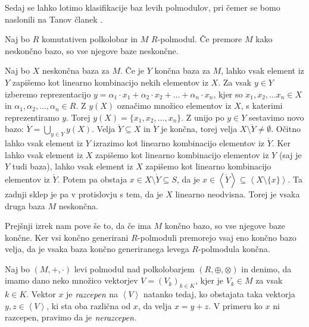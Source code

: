\documentclass[mat1]{fmfdelo}
\newcommand{\pojem}[1]{\ensuremath{\emph{#1}}}
\newcommand{\Gen}[1]{\ensuremath{\left<{#1}\right>}}
\begin{document}
Sedaj se lahko lotimo klasifikacije baz levih polmodulov, pri čemer se bomo naslonili na Tanov članek \cite{bib:Tanbase}.

\begin{izrek}
	Naj bo $R$ komutativen polkolobar in $M$ $R$-polmodul. Če premore $M$ kako neskončno bazo, so vse njegove baze neskončne.
\end{izrek}
\begin{dokaz}
	Naj bo $X$ neskončna baza za $M$. Če je $Y$ končna baza za $M$, lahko vsak element iz $Y$ zapišemo kot linearno kombinacijo nekih elementov iz $X$. Za vsak $y\in Y$ izberemo reprezentacijo $y = \alpha_1\cdot x_1 + \alpha_2\cdot x_2 + \ldots + \alpha_n\cdot x_n$, kjer so $x_1, x_2, \ldots x_n \in X$ in $\alpha_1, \alpha_2, \ldots, \alpha_n \in R$. Z $y(X)$ označimo množico elementov iz $X$, s katerimi reprezentiramo $y$. Torej $y(X) = \{x_1, x_2, \ldots, x_n\}$. Z unijo po $y\in Y$ sestavimo novo bazo: $\acute{Y} = \bigcup_{y\in Y}y(X)$. Velja $\acute{Y} \subseteq X$ in $\acute{Y}$ je končna, torej velja $X\setminus\acute{Y}\neq\emptyset$. Očitno lahko vsak element iz $Y$ izrazimo kot linearno kombinacijo elementov iz $\acute{Y}$. Ker lahko vsak element iz $X$ zapišemo kot linearno kombinacijo elementov iz $Y$ (saj je $Y$ tudi baza), lahko vsak element iz $X$ zapišemo kot linearno kombinacijo elementov iz $\acute{Y}$. Potem pa obstaja $x\in X\setminus\acute{Y} \subseteq S$, da je $x\in \Gen{\acute{Y}}\subseteq\Gen{X\setminus\{x\}}$. Ta zadnji sklep je pa v protislovju s tem, da je $X$ linearno neodvisna. Torej je vsaka druga baza $M$ neskončna.
\end{dokaz}

\begin{opomba}\label{opomb:končgenbaz}
	Prejšnji izrek nam pove še to, da če ima $M$ končno bazo, so vse njegove baze končne. Ker vsi končno generirani $R$-polmoduli premorejo vsaj eno končno bazo velja, da je vsaka baza končno generiranega levega $R$-polmodula končna.
\end{opomba}



\begin{definicija}
	Naj bo $(M, +,\cdot)$ levi polmodul nad polkolobarjem $(R, \oplus, \otimes)$ in denimo, da imamo dano neko množico vektorjev $V = (V_k)_{k\in K}$, kjer je $V_k\in M$ za vsak $k\in K$. Vektor $x$ je \pojem{razcepen} na \Gen{V} natanko tedaj, ko obstajata taka vektorja $y, z\in \Gen{V}$, ki sta oba različna od $x$, da velja $x = y + z$. V primeru ko $x$ ni razcepen, pravimo da je \pojem{nerazcepen}.
\end{definicija}
\end{document}
